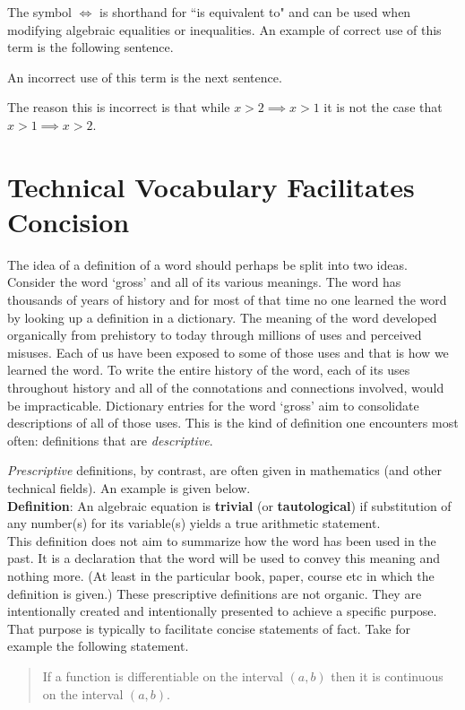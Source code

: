 \documentclass[12pt]{article}
\def\LR{\Leftrightarrow}
\def\noi{\noindent}
\def\thup{\rightthumbsup}
\def\thdn{\rightthumbsdown}
\begin{document}
The symbol $\Leftrightarrow$ is shorthand for ``is equivalent to" and can be used when modifying algebraic equalities or inequalities. An example of correct use of this term is the following sentence. 
\begin{quote}
\shabox{$x+1=2 \LR x=1.$} \thup
\end{quote}
An incorrect use of this term is the next sentence.
\begin{quote}
\shabox{$x>2 \LR x>1.$} \thdn
\end{quote}
The reason this is incorrect is that while $x>2 \implies x>1$ it is not the case that $x>1 \implies x>2.$



\section{Technical Vocabulary Facilitates Concision }

The idea of a definition of a word should perhaps be split into two ideas. \\

Consider the word `gross' and all of its various meanings. 
The word has thousands of years of history and for most of that time no one learned the word by looking up a definition in a dictionary. The meaning of the word developed organically from prehistory to today through millions of uses and perceived misuses. Each of us have been exposed to some of those uses and that is how we learned the word. 
To write the entire history of the word, each of its uses throughout history and all of the connotations and connections involved, would be impracticable. 
Dictionary entries for the word `gross' aim to consolidate descriptions of all of those uses. This is the kind of definition one encounters most often: definitions that are {\it descriptive}.

{\it Prescriptive } definitions, by contrast, are often given in mathematics (and other technical fields). An example is given below. \\

 \noi
 {\bf Definition}: An algebraic equation is {\bf trivial} (or {\bf tautological}) if substitution of any number(s) for its variable(s) yields a true arithmetic statement. \\

This definition does not aim to summarize how the word has been used in the past. It is a declaration that the word will be used to convey this meaning and nothing more. (At least in the particular book, paper, course etc in which the definition is given.) These prescriptive definitions are not organic. 
They are intentionally created and intentionally presented to achieve a specific purpose. 
That purpose is typically to facilitate concise statements of fact. 
Take for example the following statement.
\begin{quote}
If a function is differentiable on the interval $(a,b)$ then it is continuous on the interval $(a,b)$.
\end{quote}
\end{document}
